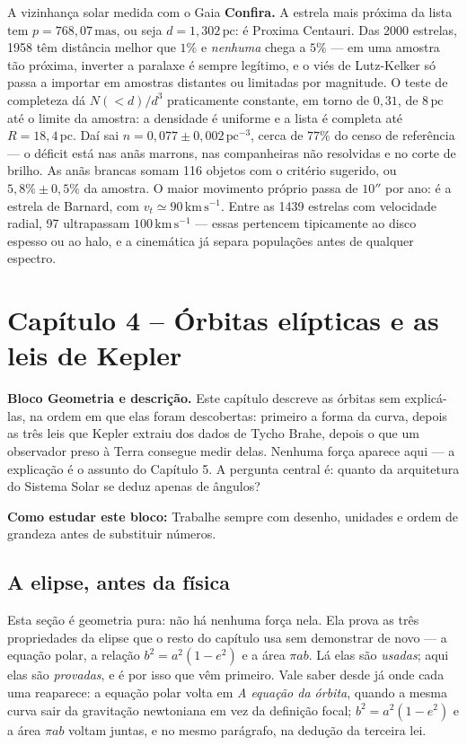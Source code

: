 \documentclass[11pt,a4paper]{article}
\newcommand{\aberturabloco}[3]{%
  \begin{noticebox}
  \textbf{Bloco #1.} #2

  \textbf{Como estudar este bloco:} #3
  \end{noticebox}
}
\begin{document}
\begin{lessonblock}[borderline west={2pt}{0pt}{astroBlue}]{A vizinhança solar medida com o Gaia}
\textbf{Confira.} A estrela mais próxima da lista tem $p=768{,}07\,\mathrm{mas}$, ou seja
$d=1{,}302\,\mathrm{pc}$: é Proxima Centauri. Das 2000 estrelas, 1958 têm distância melhor
que $1\%$ e \emph{nenhuma} chega a $5\%$ --- em uma amostra tão próxima, inverter a
paralaxe é sempre legítimo, e o viés de Lutz-Kelker só passa a importar em amostras
distantes ou limitadas por magnitude. O teste de completeza dá $N(<d)/d^{3}$ praticamente
constante, em torno de $0{,}31$, de $8\,\mathrm{pc}$ até o limite da amostra: a densidade
é uniforme e a lista é completa até $R=18{,}4\,\mathrm{pc}$. Daí sai
$n=0{,}077\pm0{,}002\,\mathrm{pc^{-3}}$, cerca de $77\%$ do censo de referência --- o
déficit está nas anãs marrons, nas companheiras não resolvidas e no corte de brilho. As
anãs brancas somam 116 objetos com o critério sugerido, ou $5{,}8\%\pm0{,}5\%$ da amostra.
O maior movimento próprio passa de $10''$ por ano: é a estrela de Barnard, com
$v_t\simeq90\,\mathrm{km\,s^{-1}}$. Entre as 1439 estrelas com velocidade radial, 97
ultrapassam $100\,\mathrm{km\,s^{-1}}$ --- essas pertencem tipicamente ao disco espesso ou
ao halo, e a cinemática já separa populações antes de qualquer espectro.
\end{lessonblock}

\newpage

\section*{Capítulo 4 -- Órbitas elípticas e as leis de Kepler}
\aberturabloco{Geometria e descrição}{Este capítulo descreve as órbitas sem explicá-las, na ordem em que elas foram descobertas: primeiro a forma da curva, depois as três leis que Kepler extraiu dos dados de Tycho Brahe, depois o que um observador preso à Terra consegue medir delas. Nenhuma força aparece aqui --- a explicação é o assunto do Capítulo 5. A pergunta central é: quanto da arquitetura do Sistema Solar se deduz apenas de ângulos?}{Trabalhe sempre com desenho, unidades e ordem de grandeza antes de substituir números.}

\subsection*{A elipse, antes da física}

Esta seção é geometria pura: não há nenhuma força nela. Ela prova as três propriedades da elipse que o resto do capítulo usa sem demonstrar de novo --- a equação polar, a relação $b^{2}=a^{2}(1-e^{2})$ e a área $\pi ab$. Lá elas são \textit{usadas}; aqui elas são \textit{provadas}, e é por isso que vêm primeiro. Vale saber desde já onde cada uma reaparece: a equação polar volta em \textit{A equação da órbita}, quando a mesma curva sair da gravitação newtoniana em vez da definição focal; $b^{2}=a^{2}(1-e^{2})$ e a área $\pi ab$ voltam juntas, e no mesmo parágrafo, na dedução da terceira lei.
\end{document}
